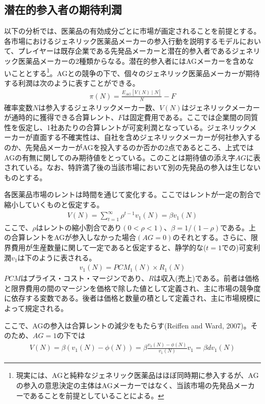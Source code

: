 \documentclass[a4j,10.5pt]{jarticle}
\begin{document}
\subsection{潜在的参入者の期待利潤 \label{ep}}
以下の分析では、医薬品の有効成分ごとに市場が画定されることを前提とする。各市場におけるジェネリック医薬品メーカーの参入行動を説明するモデルにおいて、プレイヤーは既存企業である先発品メーカーと潜在的参入者であるジェネリック医薬品メーカーの2種類からなる。潜在的参入者にはAGメーカーを含めないこととする\footnote{現実には、AGと純粋なジェネリック医薬品はほぼ同時期に参入するが、AGの参入の意思決定の主体はAGメーカーではなく、当該市場の先発品メーカーであることを前提としていることによる。}。AGとの競争の下で、個々のジェネリック医薬品メーカーが期待する利潤は次のように表すことができる。
\begin{align}
    \pi (N) = \frac{E_{AG}[V(N) \mid N]}{N} - F
\end{align}
確率変数$N$は参入するジェネリックメーカー数、$V(N)$はジェネリックメーカーが通時的に獲得できる合算レント、$F$は固定費用である。ここでは企業間の同質性を仮定し、1社あたりの合算レントが可変利潤となっている。ジェネリックメーカーが直面する不確実性は、自社を含めジェネリックメーカーが何社参入するのか、先発品メーカーがAGを投入するのか否かの2点であるところ、上式ではAGの有無に関してのみ期待値をとっている。このことは期待値の添え字$AG$に表されている。なお、特許満了後の当該市場において別の先発品の参入は生じないものとする。\par
各医薬品市場のレントは時間を通じて変化する。ここではレントが一定の割合で縮小していくものと仮定する。
\begin{align}
    V(N) = \sum_{t = 1}^{\infty} \rho^{t-1}v_1(N) = \beta v_1(N)
\end{align}
ここで、$\rho$はレントの縮小割合であり$(0<\rho<1)$、$\beta = 1/(1-\rho)$である。上の合算レントをAGが参入しなかった場合$(AG =0)$のそれとする。さらに、限界費用が生産数量に関して一定であると仮定すると、静学的な($t = 1$での)可変利潤$v_1$は下のように表される。
\begin{align}
    v_1(N) = PCM_1(N) \times R_1(N)
\end{align}
$PCM$はプライス・コスト・マージンであり、$R$は収入(売上)である。前者は価格と限界費用の間のマージンを価格で除した値として定義され、主に市場の競争度に依存する変数である。後者は価格と数量の積として定義され、主に市場規模によって規定される。\par
ここで、AGの参入は合算レントの減少をもたらす(Reiffen and Ward, 2007)。そのため、$AG=1$の下では
\begin{align}
    V(N) = \beta \left(v_1(N) - \phi(N) \right) = \beta \frac{v_1(N) - \phi(N)}{v_1(N)} v_1 = \beta d v_1(N)
\end{align}
\end{document}

